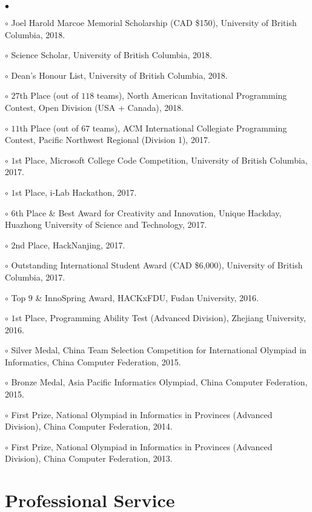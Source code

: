 \documentclass[margin,line]{res}
\newenvironment{list2}{
  \begin{list}{$\bullet$}{%
      \setlength{\itemsep}{0in}
      \setlength{\parsep}{0in} \setlength{\parskip}{0in}
      \setlength{\topsep}{0in} \setlength{\partopsep}{0in}
      \setlength{\leftmargin}{0.2in}}}{\end{list}}
\begin{document}
\begin{resume}
\begin{list2}
\item[$\circ$] Joel Harold Marcoe Memorial Scholarship (CAD \$150), University of British Columbia, 2018.
\item[$\circ$] Science Scholar, University of British Columbia, 2018.
\item[$\circ$] Dean's Honour List, University of British Columbia, 2018.
\item[$\circ$] $27$th Place (out of $118$ teams), North American Invitational Programming Contest, Open Division (USA + Canada), 2018.
\item[$\circ$] $11$th Place (out of $67$ teams), ACM International Collegiate Programming Contest, Pacific Northwest Regional (Division 1), 2017.
\item[$\circ$] $1$st Place, Microsoft College Code Competition, University of British Columbia, 2017.
\item[$\circ$] $1$st Place, i-Lab Hackathon, 2017.
\item[$\circ$] $6$th Place \& Best Award for Creativity and Innovation, Unique Hackday, Huazhong University of Science and Technology, 2017.
\item[$\circ$] $2$nd Place, HackNanjing, 2017.
\item[$\circ$] Outstanding International Student Award (CAD \$6,000), University of British Columbia, 2017.
\item[$\circ$] Top $9$ \& InnoSpring Award, HACKxFDU, Fudan University, 2016.
\item[$\circ$] $1$st Place, Programming Ability Test (Advanced Division), Zhejiang University, 2016.
\item[$\circ$] Silver Medal, China Team Selection Competition for International Olympiad in Informatics, China Computer Federation, 2015.
\item[$\circ$] Bronze Medal, Asia Pacific Informatics Olympiad, China Computer Federation, 2015.
\item[$\circ$] First Prize, National Olympiad in Informatics in Provinces (Advanced Division), China Computer Federation, 2014.
\item[$\circ$] First Prize, National Olympiad in Informatics in Provinces (Advanced Division), China Computer Federation, 2013.
\end{list2}


\section{\sc Professional Service}


\end{resume}
\end{document}
